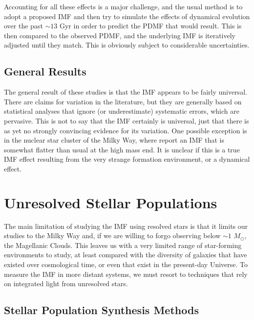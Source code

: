 Accounting for all these effects is a major challenge, and the usual method is to adopt a proposed IMF and then try to simulate the effects of dynamical evolution over the past $\sim 13$ Gyr in order to predict the PDMF that would result. This is then compared to the observed PDMF, and the underlying IMF is iteratively adjusted until they match. This is obviously subject to considerable uncertainties.

\subsection{General Results}

The general result of these studies is that the IMF appears to be fairly universal. There are claims for variation in the literature, but they are generally based on statistical analyses that ignore (or underestimate) systematic errors, which are pervasive. This is not to say that the IMF certainly is universal, just that there is as yet no strongly convincing evidence for its variation. One possible exception is in the nuclear star cluster of the Milky Way, where \citet{lu13a} report an IMF that is somewhat flatter than usual at the high mass end. It is unclear if this is a true IMF effect resulting from the very strange formation environment, or a dynamical effect.


\section{Unresolved Stellar Populations}

The main limitation of studying the IMF using resolved stars is that it limits our studies to the Milky Way and, if we are willing to forgo observing below $\sim 1$ $M_\odot$, the Magellanic Clouds. This leaves us with a very limited range of star-forming environments to study, at least compared with the diversity of galaxies that have existed over cosmological time, or even that exist in the present-day Universe. To measure the IMF in more distant systems, we must resort to techniques that rely on integrated light from unresolved stars.

\subsection{Stellar Population Synthesis Methods}

